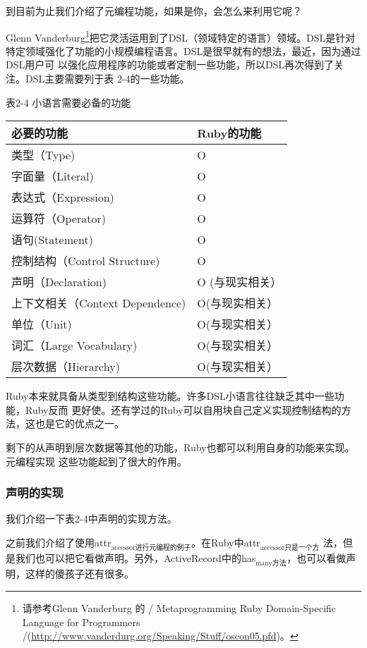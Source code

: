 \documentclass[11pt]{ctexart}
\begin{document}
到目前为止我们介绍了元编程功能，如果是你，会怎么来利用它呢？

Glenn Vanderburg\footnote{请参考Glenn Vanderburg 的  / Metaprogramming Ruby Domain-Specific
Language for Programmers /(\url{http://www.vanderdurg.org/Speaking/Stuff/oscon05.pfd})。}把它灵活运用到了DSL（领域特定的语言）领域。DSL是针对
特定领域强化了功能的小规模编程语言。DSL是很早就有的想法，最近，因为通过DSL用户可
以强化应用程序的功能或者定制一些功能，所以DSL再次得到了关注。DSL主要需要列于表
2-4的一些功能。

表2-4 小语言需要必备的功能

\begin{center}
\begin{tabular}{ll}
必要的功能 & Ruby的功能\\
\hline
类型（Type) & O\\
字面量（Literal) & O\\
表达式（Expression) & O\\
运算符（Operator) & O\\
语句(Statement) & O\\
控制结构（Control Structure) & O\\
声明（Declaration) & O (与现实相关）\\
上下文相关（Context Dependence) & O(与现实相关）\\
单位（Unit) & O(与现实相关）\\
词汇（Large Vocabulary) & O(与现实相关）\\
层次数据（Hierarchy) & O(与现实相关）\\
\hline
\end{tabular}
\end{center}


Ruby本来就具备从类型到结构这些功能。许多DSL小语言往往缺乏其中一些功能，Ruby反而
更好使。还有学过的Ruby可以自用块自己定义实现控制结构的方法，这也是它的优点之一。

剩下的从声明到层次数据等其他的功能，Ruby也都可以利用自身的功能来实现。元编程实现
这些功能起到了很大的作用。
\subsubsection{声明的实现}
\label{sec:orgc7f900d}

我们介绍一下表2-4中声明的实现方法。

之前我们介绍了使用attr\(_{\text{accessor进行元编程的例子}}\)。在Ruby中attr\(_{\text{accessor只是一个方}}\)
法，但是我们也可以把它看做声明。另外，ActiveRecord中的has\(_{\text{many方法}}\)，也可以看做声
明，这样的傻孩子还有很多。
\end{document}
